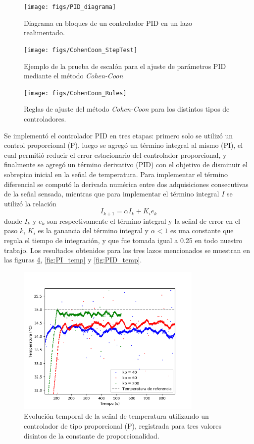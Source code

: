 \documentclass[a4paper,11pt]{article}
\begin{document}
\begin{figure}[H]
\centering
\texttt{[image: figs/PID\_diagrama]}
\caption{Diagrama en bloques de un controlador PID en un lazo realimentado.}
\label{fig:PID_diagrama}
\end{figure}

\begin{figure}[H]
\centering
\texttt{[image: figs/CohenCoon\_StepTest]}
\caption{Ejemplo de la prueba de escalón para el ajuste de parámetros PID mediante el
método \emph{Cohen-Coon}}
\label{fig:CohenCoon_StepTest}
\end{figure}

\begin{figure}[!ht]
\centering
\texttt{[image: figs/CohenCoon\_Rules]}
\caption{Reglas de ajuste del método \emph{Cohen-Coon} para los
\label{fig:CohenCoon_Rules}
distintos tipos de controladores.}
\end{figure}

Se implementó el controlador PID en tres etapas: primero solo se utilizó
un control proporcional (P), luego se agregó un término integral al
mismo (PI), el cual permitió reducir el error estacionario del controlador
proporcional, y finalmente se agregó un término derivativo (PID) con el
objetivo de disminuir el sobrepico inicial en la señal de temperatura. Para implementar el término diferencial se computó la derivada numérica entre dos adquisiciones consecutivas de la señal sensada, mientras que para implementar el término integral $I$ se utilizó la relación
\begin{equation}
	I_{k+1} = \alpha I_k + K_i e_k
\end{equation}
donde $I_k$ y $e_k$ son respectivamente el término integral y la señal de error en el paso $k$, $K_i$ es la ganancia del término integral y $\alpha<1$ es una constante que regula el tiempo de integración, y que fue tomada igual a \SI{0.25}{} en todo nuestro trabajo. Los resultados obtenidos para los tres lazos mencionados se muestran en las figuras \ref{fig:P_temp}, \ref{fig:PI_temp} y \ref{fig:PID_temp}.

\begin{figure}[!h]
\centering
\includegraphics[width=0.8\textwidth]{figs/P_temp}
\caption{Evolución temporal de la señal de temperatura utilizando
un controlador de tipo proporcional (P), registrada para tres valores
disintos de la constante de proporcionalidad.}
\label{fig:P_temp}
\end{figure}
\end{document}
